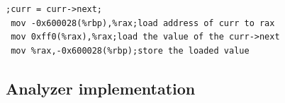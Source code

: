 \begin{lstlisting}[caption={x86 Assembly for traversal}, label=x86code,style=customasm,captionpos=b]
;curr = curr->next;
 mov -0x600028(%rbp),%rax;load address of curr to rax
 mov 0xff0(%rax),%rax;load the value of the curr->next
 mov %rax,-0x600028(%rbp);store the loaded value
\end{lstlisting}
    
\vspace{-0.6cm}
\subsection{Analyzer implementation}
\begin{table}[]

\caption{Workloads used for analysis. 
They represent a diverse spectrum of pointer-based fault intensity as shown in ~\autoref{fig:pointer_pagefaults}. WSS is the working set size in RAM}
\label{tab:workloads}
\vspace{-0.75cm}
\end{table}

